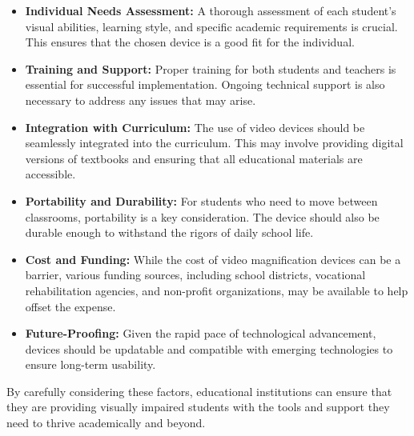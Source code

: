 \begin{itemize}
	\item \textbf{Individual Needs Assessment:} A thorough assessment of each student's visual abilities, learning style, and specific academic requirements is crucial. This ensures that the chosen device is a good fit for the individual.
	\item \textbf{Training and Support:} Proper training for both students and teachers is essential for successful implementation. Ongoing technical support is also necessary to address any issues that may arise.
	\item \textbf{Integration with Curriculum:} The use of video  devices should be seamlessly integrated into the curriculum. This may involve providing digital versions of textbooks and ensuring that all educational materials are accessible.
	\item \textbf{Portability and Durability:} For students who need to move between classrooms, portability is a key consideration. The device should also be durable enough to withstand the rigors of daily school life.
	\item \textbf{Cost and Funding:} While the cost of video magnification devices can be a barrier, various funding sources, including school districts, vocational rehabilitation agencies, and non-profit organizations, may be available to help offset the expense.
	\item \textbf{Future-Proofing:} Given the rapid pace of technological advancement, devices should be updatable and compatible with emerging technologies to ensure long-term usability.
\end{itemize}

By carefully considering these factors, educational institutions can ensure that they are providing visually impaired students with the tools and support they need to thrive academically and beyond.

